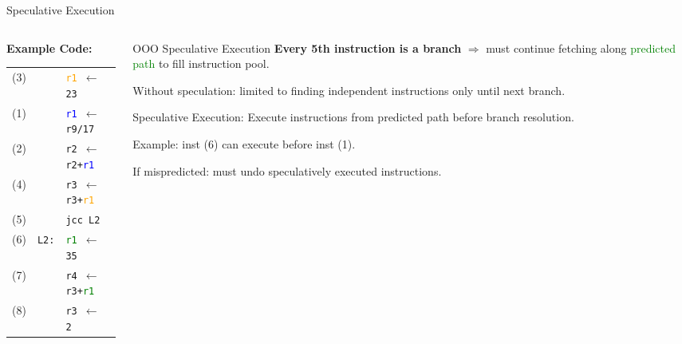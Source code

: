 \documentclass[aspectratio=169,12pt]{beamer}
\begin{document}
\begin{frame}{Speculative Execution}
  \begin{columns}
    \begin{column}{0.45\textwidth}
      \textbf{Example Code:} \\
      \begin{tabular}{lll}
        (3) & & \texttt{\textcolor{orange}{r1} $\leftarrow$ 23} \\
        (1) & & \texttt{\textcolor{blue}{r1} $\leftarrow$ r9/17} \\
        (2) & & \texttt{r2 $\leftarrow$ r2+\textcolor{blue}{r1}} \\
        (4) & & \texttt{r3 $\leftarrow$ r3+\textcolor{orange}{r1}} \\
        (5) & & \texttt{jcc L2} \\
        \rowcolor{pink!30} (6) & \texttt{L2:} & \texttt{\textcolor{green}{r1} $\leftarrow$ 35} \\
        \rowcolor{pink!30} (7) & & \texttt{r4 $\leftarrow$ r3+\textcolor{green}{r1}} \\
        \rowcolor{pink!30} (8) & & \texttt{r3 $\leftarrow$ 2} \\
      \end{tabular}
    \end{column}
    
    \begin{column}{0.55\textwidth}
      \begin{block}{OOO Speculative Execution}
        \small
        \textbf{Every 5th instruction is a branch} $\Rightarrow$ must continue fetching along \textcolor{green}{predicted path} to fill instruction pool.
        
        Without speculation: limited to finding independent instructions only until next branch.
        
        \alert{Speculative Execution:} Execute instructions from predicted path before branch resolution.
        
        Example: inst (6) can execute before inst (1).
        
        If mispredicted: must undo speculatively executed instructions.
      \end{block}
    \end{column}
  \end{columns}
\end{frame}
\end{document}
